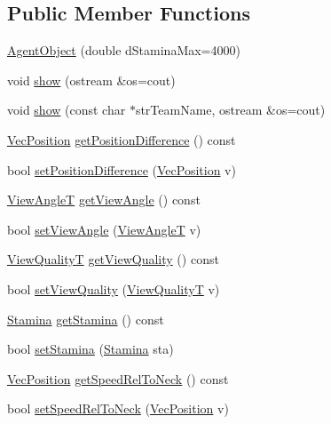 \subsection*{Public Member Functions}
\begin{DoxyCompactItemize}
\item 
\hyperlink{classAgentObject_a46e0f4f9c495d64be7387425ac96c2ab}{Agent\+Object} (double d\+Stamina\+Max=4000)
\item 
void \hyperlink{classAgentObject_a0043cea8d237828930412eb3c2b84e32}{show} (ostream \&os=cout)
\item 
void \hyperlink{classAgentObject_ad486225386c1baa9218b5aa5d2045427}{show} (const char $\ast$str\+Team\+Name, ostream \&os=cout)
\item 
\hyperlink{classVecPosition}{Vec\+Position} \hyperlink{classAgentObject_a332c731bfaad817e328bab1906f59359}{get\+Position\+Difference} () const 
\item 
bool \hyperlink{classAgentObject_a982932ce580cbb643ed6be3f5c676351}{set\+Position\+Difference} (\hyperlink{classVecPosition}{Vec\+Position} v)
\item 
\hyperlink{SoccerTypes_8h_ade95094b8e117801bea82ec390cccf64}{View\+AngleT} \hyperlink{classAgentObject_a82da0c18490bd63868c3a399b168c8fd}{get\+View\+Angle} () const 
\item 
bool \hyperlink{classAgentObject_a55a226e986485f9f1995987eb4e6487b}{set\+View\+Angle} (\hyperlink{SoccerTypes_8h_ade95094b8e117801bea82ec390cccf64}{View\+AngleT} v)
\item 
\hyperlink{SoccerTypes_8h_a5ae52e4e8062de90b118eacb03e99906}{View\+QualityT} \hyperlink{classAgentObject_a9bd2e9ea93f7c9f4dadfb2e44496528d}{get\+View\+Quality} () const 
\item 
bool \hyperlink{classAgentObject_a40347ef44cedf172b2a8edebade46805}{set\+View\+Quality} (\hyperlink{SoccerTypes_8h_a5ae52e4e8062de90b118eacb03e99906}{View\+QualityT} v)
\item 
\hyperlink{classStamina}{Stamina} \hyperlink{classAgentObject_a167b9e6b5a2571f1886279dafbbb59d7}{get\+Stamina} () const 
\item 
bool \hyperlink{classAgentObject_a0f2ec1a68d2edbf1cda4cea847f9e5b8}{set\+Stamina} (\hyperlink{classStamina}{Stamina} sta)
\item 
\hyperlink{classVecPosition}{Vec\+Position} \hyperlink{classAgentObject_a05a81dbb6cefe6ad2b4548d084ad456b}{get\+Speed\+Rel\+To\+Neck} () const 
\item 
bool \hyperlink{classAgentObject_a9fe0db948cb05d01707e78b44e96c7f8}{set\+Speed\+Rel\+To\+Neck} (\hyperlink{classVecPosition}{Vec\+Position} v)

\end{DoxyCompactItemize}
